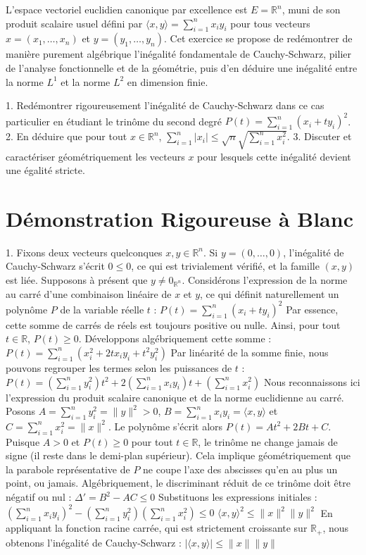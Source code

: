 \documentclass{report}
\begin{document}
L'espace vectoriel euclidien canonique par excellence est $E = \mathbb{R}^n$, muni de son produit scalaire usuel défini par $\langle x, y \rangle = \sum_{i=1}^n x_i y_i$ pour tous vecteurs $x = (x_1, \ldots, x_n)$ et $y = (y_1, \ldots, y_n)$. Cet exercice se propose de redémontrer de manière purement algébrique l'inégalité fondamentale de Cauchy-Schwarz, pilier de l'analyse fonctionnelle et de la géométrie, puis d'en déduire une inégalité entre la norme $L^1$ et la norme $L^2$ en dimension finie.

1. Redémontrer rigoureusement l'inégalité de Cauchy-Schwarz dans ce cas particulier en étudiant le trinôme du second degré $P(t) = \sum_{i=1}^n (x_i + t y_i)^2$.
2. En déduire que pour tout $x \in \mathbb{R}^n$, $\sum_{i=1}^n |x_i| \le \sqrt{n} \sqrt{\sum_{i=1}^n x_i^2}$.
3. Discuter et caractériser géométriquement les vecteurs $x$ pour lesquels cette inégalité devient une égalité stricte.

\section*{Démonstration Rigoureuse à Blanc}

1. Fixons deux vecteurs quelconques $x, y \in \mathbb{R}^n$. Si $y = (0, \ldots, 0)$, l'inégalité de Cauchy-Schwarz s'écrit $0 \le 0$, ce qui est trivialement vérifié, et la famille $(x, y)$ est liée. Supposons à présent que $y \neq 0_{\mathbb{R}^n}$. Considérons l'expression de la norme au carré d'une combinaison linéaire de $x$ et $y$, ce qui définit naturellement un polynôme $P$ de la variable réelle $t$ :
   $ P(t) = \sum_{i=1}^n (x_i + t y_i)^2 $
   Par essence, cette somme de carrés de réels est toujours positive ou nulle. Ainsi, pour tout $t \in \mathbb{R}$, $P(t) \ge 0$. Développons algébriquement cette somme :
   $ P(t) = \sum_{i=1}^n (x_i^2 + 2t x_i y_i + t^2 y_i^2) $
   Par linéarité de la somme finie, nous pouvons regrouper les termes selon les puissances de $t$ :
   $ P(t) = \left( \sum_{i=1}^n y_i^2 \right) t^2 + 2 \left( \sum_{i=1}^n x_i y_i \right) t + \left( \sum_{i=1}^n x_i^2 \right) $
   Nous reconnaissons ici l'expression du produit scalaire canonique et de la norme euclidienne au carré. Posons $A = \sum_{i=1}^n y_i^2 = \|y\|^2 > 0$, $B = \sum_{i=1}^n x_i y_i = \langle x, y \rangle$ et $C = \sum_{i=1}^n x_i^2 = \|x\|^2$. Le polynôme s'écrit alors $P(t) = A t^2 + 2B t + C$.
   Puisque $A > 0$ et $P(t) \ge 0$ pour tout $t \in \mathbb{R}$, le trinôme ne change jamais de signe (il reste dans le demi-plan supérieur). Cela implique géométriquement que la parabole représentative de $P$ ne coupe l'axe des abscisses qu'en au plus un point, ou jamais. Algébriquement, le discriminant réduit de ce trinôme doit être négatif ou nul :
   $ \Delta' = B^2 - AC \le 0 $
   Substituons les expressions initiales :
   $ \left( \sum_{i=1}^n x_i y_i \right)^2 - \left( \sum_{i=1}^n y_i^2 \right) \left( \sum_{i=1}^n x_i^2 \right) \le 0 $
   $ \langle x, y \rangle^2 \le \|x\|^2 \|y\|^2 $
   En appliquant la fonction racine carrée, qui est strictement croissante sur $\mathbb{R}_+$, nous obtenons l'inégalité de Cauchy-Schwarz :
   $ |\langle x, y \rangle| \le \|x\| \|y\| $
\end{document}
